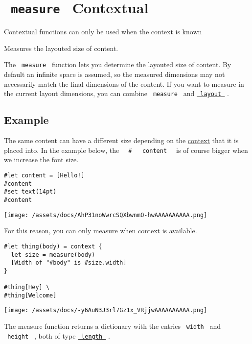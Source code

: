 \section{\texorpdfstring{\texttt{\ measure\ } {{ Contextual
}}}{ measure   Contextual }}\label{summary}

\label{contextual-tooltip}
Contextual functions can only be used when the context is known

Measures the layouted size of content.

The \texttt{\ measure\ } function lets you determine the layouted size
of content. By default an infinite space is assumed, so the measured
dimensions may not necessarily match the final dimensions of the
content. If you want to measure in the current layout dimensions, you
can combine \texttt{\ measure\ } and
\href{/docs/reference/layout/layout/}{\texttt{\ layout\ }} .

\subsection{Example}\label{example}

The same content can have a different size depending on the
\href{/docs/reference/context/}{context} that it is placed into. In the
example below, the
\texttt{\ }{\texttt{\ \#\ }}\texttt{\ }{\texttt{\ content\ }}\texttt{\ }
is of course bigger when we increase the font size.

\begin{verbatim}
#let content = [Hello!]
#content
#set text(14pt)
#content
\end{verbatim}

\texttt{[image: /assets/docs/AhP31noWwrcSQXbwnmO-hwAAAAAAAAAA.png]}

For this reason, you can only measure when context is available.

\begin{verbatim}
#let thing(body) = context {
  let size = measure(body)
  [Width of "#body" is #size.width]
}

#thing[Hey] \
#thing[Welcome]
\end{verbatim}

\texttt{[image: /assets/docs/-y6AuN3J3rl7Gz1x\_VRjjwAAAAAAAAAA.png]}

The measure function returns a dictionary with the entries
\texttt{\ width\ } and \texttt{\ height\ } , both of type
\href{/docs/reference/layout/length/}{\texttt{\ length\ }} .

